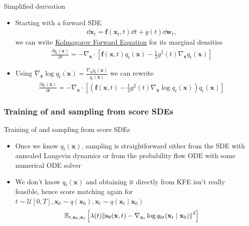 \documentclass{beamer}
\begin{document}
\begin{frame}{Simplified derivation}
\begin{itemize}
  \item Starting with a forward SDE
  \begin{align}
    \dd \mathbf{x}_t = \mathbf{f}(\mathbf{x}_t, t) \dd t + g(t)\dd \mathbf{w}_t, 
  \end{align}
  we can write \underline{Kolmogorov Forward Equation} for its marginal densities
  \begin{align}
    \frac{\partial q_t(\mathbf{x})}{\partial t} = -\nabla_{\mathbf{x}} \cdot \left[\mathbf{f}(\mathbf{x}, t)q_t(\mathbf{x}) - \frac{1}{2}g^2(t) \nabla_{\mathbf{x}} q_t(\mathbf{x})\right]
  \end{align}
  \item Using $\nabla_{\mathbf{x}} \log q_t(\mathbf{x}) = \frac{\nabla_{\mathbf{x}} q_t(\mathbf{x})}{q_t(\mathbf{x})}$ we can rewrite 
  \begin{align}
    \frac{\partial q_t(\mathbf{x})}{\partial t} = -\nabla_{\mathbf{x}} \cdot \left[(\mathbf{f}(\mathbf{x}, t) - \frac{1}{2}g^2(t) \nabla_{\mathbf{x}} \log q_t(\mathbf{x})) q_t(\mathbf{x}) \right]
  \end{align}
\end{itemize}
\end{frame}

\subsubsection{Training of and sampling from score SDEs}
\begin{frame}{Training of and sampling from score SDEs}
\begin{itemize}
  \item Once we know $q_t(\mathbf{x})$, sampling is straightforward either from the SDE with annealed Langevin dynamics or from the probability flow ODE with some numerical ODE solver
  \item We don't know $q_t(\mathbf{x})$ and obtaining it directly from KFE isn't really feasible, hence score matching again for $t \sim \mathcal{U}[0, T], \mathbf{x}_0 \sim q(\mathbf{x}_0), \mathbf{x}_t \sim q(\mathbf{x}_t \mid \mathbf{x}_0)$
  \begin{align}
    \mathbb{E}_{t, \mathbf{x}_0, \mathbf{x}_t}\left[\lambda(t)\norm{\mathbf{s}_\theta(\mathbf{x}, t) - \nabla_{\mathbf{x}_t} \log q_{0t}(\mathbf{x}_t \mid \mathbf{x}_0)}^2\right]
  \end{align}
\end{itemize}
\end{frame}
\end{document}
